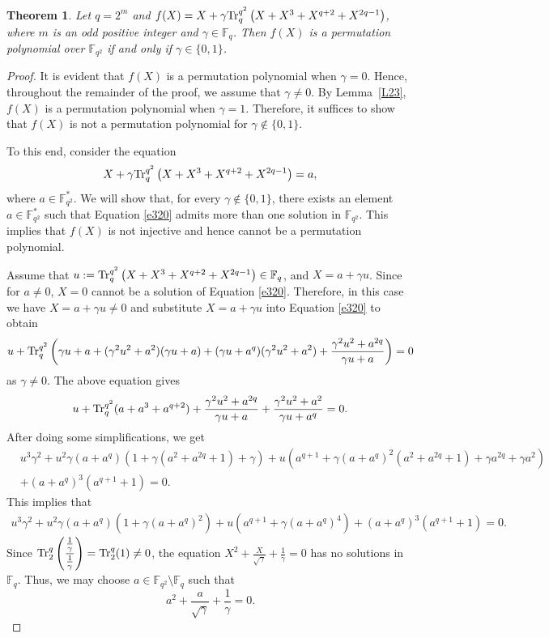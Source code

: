 \documentclass[11pt]{amsart}
\theoremstyle{plain}
\newtheorem{thm}{Theorem}[section]
\numberwithin{equation}{section}
\theoremstyle{definition}
\newcommand{\F}{\mathbb F}
\def\Tr{{\rm Tr}}
\begin{document}
\begin{thm}\label{T33}
Let $q = 2^m$ and $f(X)=X+\gamma \Tr_{q}^{q^2}\left(X+X^3+X^{q+2}+X^{2q-1}\right)$, where $m$ is an odd positive integer and $\gamma \in \F_q$. Then $f(X)$ is a permutation polynomial over $\mathbb{F}_{q^2}$ if and only if $\gamma \in \{0,1\}$.
\end{thm}
\begin{proof}
It is evident that \(f(X)\) is a permutation polynomial when \(\gamma=0\). Hence, throughout the remainder of the proof, we assume that \(\gamma\neq 0\). By Lemma~\ref{L23}, \(f(X)\) is a permutation polynomial when \(\gamma=1\). Therefore, it suffices to show that \(f(X)\) is not a permutation polynomial for \(\gamma\notin\{0,1\}\).

To this end, consider the equation
\begin{equation}\label{e320}
X+\gamma \Tr_{q}^{q^2}\left(X+X^3+X^{q+2}+X^{2q-1}\right)=a,
\end{equation}
where \(a\in\F_{q^2}^{*}\). We will show that, for every \(\gamma\notin\{0,1\}\), there exists an element \(a\in\F_{q^2}^{*}\) such that Equation \eqref{e320} admits more than one solution in \(\F_{q^2}\). This implies that \(f(X)\) is not injective and hence cannot be a permutation polynomial.

Assume that $u:=\Tr_{q}^{q^2}\left(X+X^3+X^{q+2}+X^{2q-1}\right) \in \F_q$, and $X=a+\gamma u$. Since for $a \neq 0$, $X=0$ cannot be a solution of Equation \eqref{e320}. Therefore, in this case we have $X=a+\gamma u \neq 0$ and substitute $X=a+\gamma u$ into Equation \eqref{e320} to obtain
\[
u+\Tr_{q}^{q^2}\left(\gamma u+a+(\gamma^2 u^2+a^2)(\gamma u+a)+(\gamma u+a^q)(\gamma^2 u^2+a^2)+\frac{\gamma^2u^2+a^{2q}}{\gamma u+a}\right)=0
\]
as $\gamma \neq 0$.
The above equation gives 
\[
u+\Tr_{q}^{q^2}(a+a^3+a^{q+2})+\frac{\gamma^2 u^2+a^{2q}}{\gamma u+a}+\frac{\gamma^2 u^2+a^2}{\gamma u +a^q}=0.
\]
After doing some simplifications, we get 
\begin{equation*}
\begin{split}
&u^3\gamma^2+u^{2} \gamma (a+a^q)(1+\gamma (a^2+a^{2q}+1)+\gamma)+u\left(a^{q+1}+\gamma (a+a^q)^2(a^2+a^{2q}+1)+\gamma a^{2q}+\gamma a^2\right)\\&+(a+a^q)^3(a^{q+1}+1)=0.
\end{split}
\end{equation*}
This implies that
\begin{equation}\label{e321}
\begin{split}
u^3\gamma^2+u^{2} \gamma (a+a^q)(1+\gamma (a+a^{q})^2)+u\left(a^{q+1}+\gamma (a+a^q)^4\right)+(a+a^q)^3(a^{q+1}+1)=0.
\end{split}
\end{equation}
Since $\Tr_{2}^{q}\left(\dfrac{\frac{1}{\gamma}}{\frac{1}{\gamma}}\right)=\Tr_{2}^{q}(1)\neq 0$, the equation $X^2+\frac{X}{\sqrt{\gamma}}+\frac{1}{\gamma}=0$ has no solutions in $\F_q$. Thus, we may choose $a \in \F_{q^2}\setminus \F_q$ such that
\begin{equation}\label{E31}
    a^2+\frac{a}{\sqrt{\gamma}}+\frac{1}{\gamma}=0.
\end{equation}


\end{proof}
\end{document}
